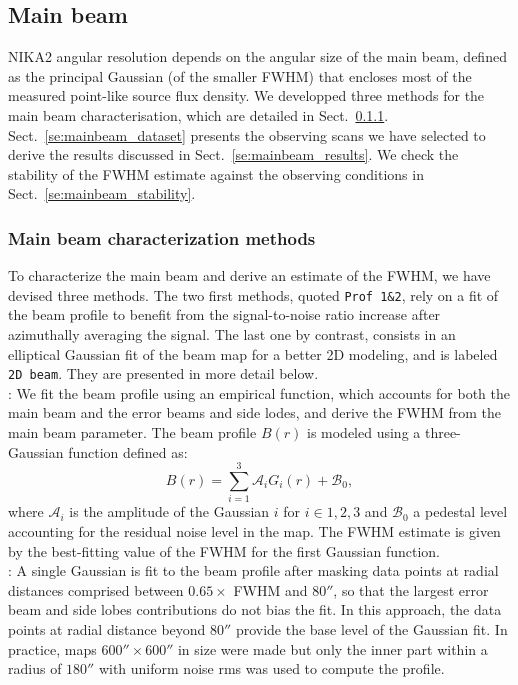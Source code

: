 \subsection{Main beam}
\label{se:mainbeam}

NIKA2 angular resolution depends on the angular size of the main beam,
defined as the principal Gaussian (of the smaller FWHM) that encloses
most of the measured point-like source flux density. We developped
three methods for the main beam characterisation, which are detailed
in Sect.~\ref{se:mainbeam_methods}. Sect.~\ref{se:mainbeam_dataset}
presents the observing scans we have selected to derive the results
discussed in Sect.~\ref{se:mainbeam_results}. We check the stability
of the FWHM estimate against the observing conditions in
Sect.~\ref{se:mainbeam_stability}.


\subsubsection{Main beam characterization methods}
\label{se:mainbeam_methods}
To characterize the main beam and derive an estimate of the FWHM, we
have devised three methods. The two first methods, quoted
{\tt Prof 1\&2}, rely on a fit
of the beam profile to benefit from the signal-to-noise ratio increase
after azimuthally averaging the signal. The last one by contrast,
consists in an elliptical Gaussian fit of the beam map for a better
2D modeling, and is labeled {\tt 2D beam}. They are presented in more
detail below. \\

: We fit the beam profile using an empirical function,
which accounts for both the main beam and the error beams and side
lodes, and derive the FWHM from the main beam parameter. The beam
profile $B(r)$ is modeled using a three-Gaussian function defined as:
\begin{equation}
  B(r) = \sum_{i=1}^{3} \mathcal{A}_i G_i(r) + \mathcal{B}_0,
  \label{eq:3gauss}
\end{equation}
where $\mathcal{A}_i$ is the amplitude of the Gaussian $i$ for $i \in {1, 2, 3}$ and
$\mathcal{B}_0$ a pedestal level accounting for the residual noise
level in the map. The FWHM estimate is given by the best-fitting value
of the FWHM for the first Gaussian function.\\

: A single Gaussian is fit to the beam profile after
masking data points at radial distances comprised between
$0.65 \times$ FWHM and $80''$, so that the largest error beam and
side lobes contributions do not bias the fit. In this approach, the
data points at radial distance beyond $80''$ provide the base level
of the Gaussian fit. In practice, maps $600'' \times 600''$ in size
were made but only the inner part within a radius of $180''$ with
uniform noise rms was used to compute the profile.\\

